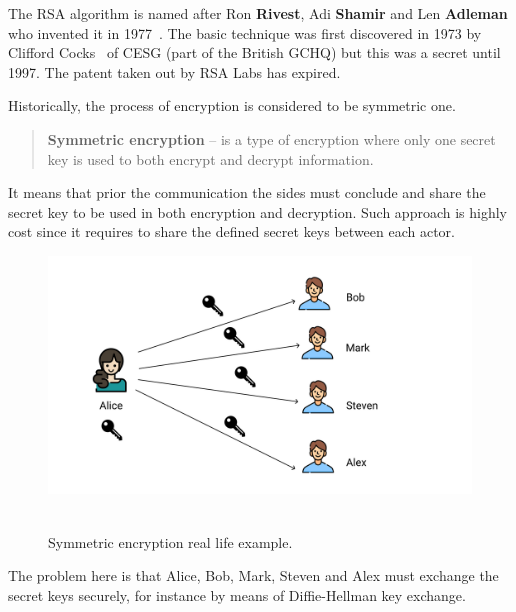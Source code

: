 ﻿The RSA algorithm is named after Ron \textbf{Rivest}, Adi \textbf{Shamir} and Len \textbf{Adleman}
who invented it in 1977~\cite{rivest1978method}.
The basic technique was first discovered in 1973 by Clifford Cocks~\cite{cocks1973note} of
CESG (part of the British GCHQ)
but this was a secret until 1997.
The patent taken out by RSA Labs has expired.

Historically, the process of encryption is considered to be symmetric one.
\begin{quote}
    \textbf{Symmetric encryption} -- is a type of encryption where only one secret key is
    used to both encrypt and decrypt information.
\end{quote}
It means that prior the communication the sides must conclude and share the secret key to be used in
both encryption and decryption.
Such approach is highly cost since it requires to share the defined secret keys between each actor.

\begin{figure}[H]
    \centering
    \includegraphics[width=1.15\textwidth]{./img/Symmetric_encryption}
    ~\caption{Symmetric encryption real life example.}
    \label{fig:symmetric-encryption}
\end{figure}

The problem here is that Alice, Bob, Mark, Steven and Alex must exchange the secret keys securely,
for instance by means of Diffie-Hellman key exchange.

